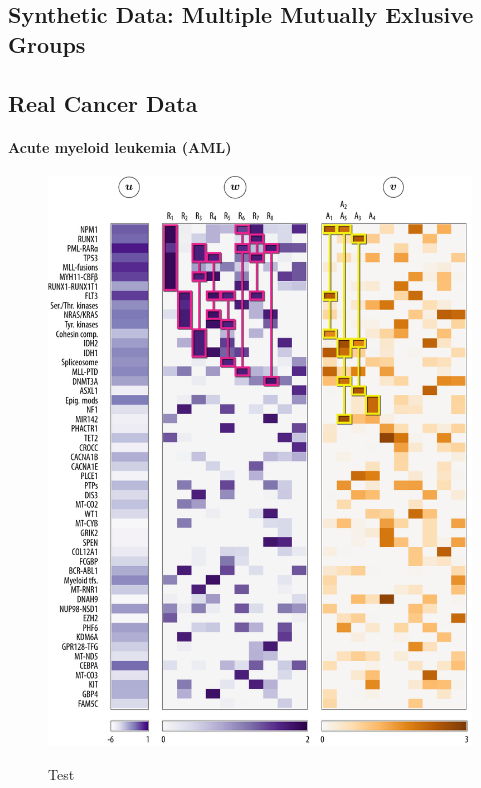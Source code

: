 \setlength{}
\setlength{}
\begin{figure}[htb]
  \centering
  
  \caption{
    \todo{}
  }
  \label{fig:syn_multi}
\end{figure}

\subsection{Synthetic Data: Multiple Mutually Exlusive Groups}

\subsection{Real Cancer Data}

\paragraph{Acute myeloid leukemia (AML)}

\begin{figure}[htbp]
\centering
\includegraphics[width=\textwidth]{figures/genes/mat_aml.pdf}\\[2em]
\caption{Test}
\end{figure}

